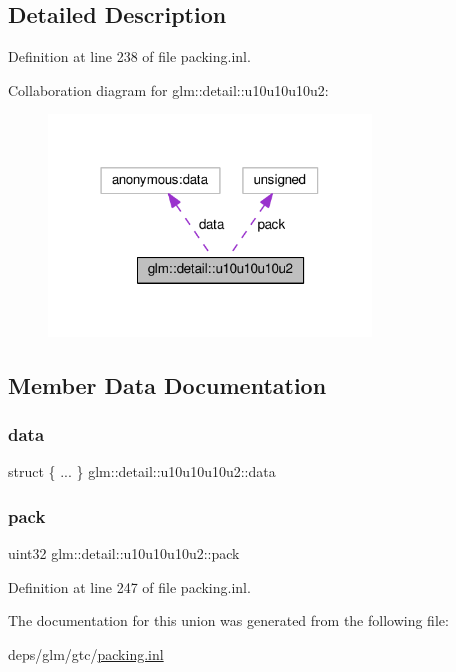 \subsection{Detailed Description}


Definition at line 238 of file packing.\+inl.



Collaboration diagram for glm\+:\+:detail\+:\+:u10u10u10u2\+:
\nopagebreak
\begin{figure}[H]
\begin{center}
\leavevmode
\includegraphics[width=243pt]{db/d35/unionglm_1_1detail_1_1u10u10u10u2__coll__graph}
\end{center}
\end{figure}


\subsection{Member Data Documentation}
\mbox{\label{unionglm_1_1detail_1_1u10u10u10u2_a2b1c07bb6d4d674dade5bd7c1e91c791}} 
\subsubsection{\texorpdfstring{data}{data}}
{\footnotesize\ttfamily struct \{ ... \}   glm\+::detail\+::u10u10u10u2\+::data}

\mbox{\label{unionglm_1_1detail_1_1u10u10u10u2_a8bb9d7804af09ba3790a4b5622321511}} 
\subsubsection{\texorpdfstring{pack}{pack}}
{\footnotesize\ttfamily uint32 glm\+::detail\+::u10u10u10u2\+::pack}



Definition at line 247 of file packing.\+inl.



The documentation for this union was generated from the following file\+:\begin{DoxyCompactItemize}
\item 
deps/glm/gtc/\hyperlink{packing_8inl}{packing.\+inl}\end{DoxyCompactItemize}

